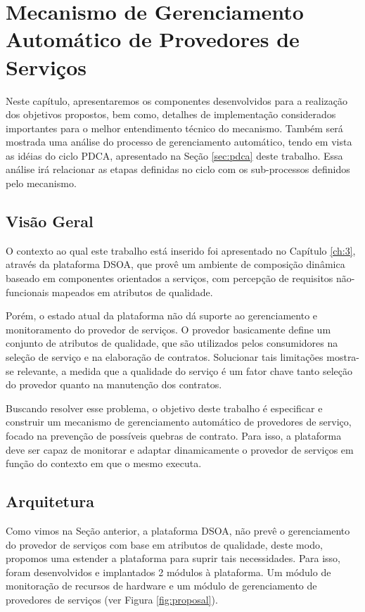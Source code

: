 \chapter{Mecanismo de Gerenciamento Automático de Provedores de Serviços}
\label{ch:4}

Neste capítulo, apresentaremos os componentes desenvolvidos para a realização dos objetivos propostos, bem como, detalhes de implementação considerados importantes para o melhor entendimento técnico do mecanismo. Também será mostrada uma análise do processo de gerenciamento automático, tendo em vista as idéias do ciclo PDCA, apresentado na Seção \ref{sec:pdca} deste trabalho. Essa análise irá relacionar as etapas definidas no ciclo com os sub-processos definidos pelo mecanismo.

\section{Visão Geral}
O contexto ao qual este trabalho está inserido foi apresentado no Capítulo \ref{ch:3}, através da plataforma DSOA, que provê um ambiente de composição dinâmica baseado em componentes orientados a serviços, com percepção de requisitos não-funcionais mapeados em atributos de qualidade. 

Porém, o estado atual da plataforma não dá suporte ao gerenciamento e monitoramento do provedor de serviços. O provedor basicamente define um conjunto de atributos de qualidade, que são utilizados pelos consumidores na seleção de serviço e na elaboração de contratos. Solucionar tais limitações mostra-se relevante, a medida que a qualidade do serviço é um fator chave tanto seleção do provedor quanto na manutenção dos contratos.

Buscando resolver esse problema, o objetivo deste trabalho é especificar e construir um mecanismo de gerenciamento automático de provedores de serviço, focado na prevenção de possíveis quebras de contrato. Para isso, a plataforma deve ser capaz de monitorar e adaptar dinamicamente o provedor de serviços em função do contexto em que o mesmo executa.


\section{Arquitetura}
\label{sec:arch_prop}

Como vimos na Seção anterior, a plataforma DSOA, não prevê o gerenciamento do provedor de serviços com base em atributos de qualidade, deste modo, propomos uma estender a plataforma para suprir tais necessidades. Para isso, foram desenvolvidos e implantados 2 módulos à plataforma. Um módulo de monitoração de recursos de hardware e um módulo de gerenciamento de provedores de serviços (ver Figura \ref{fig:proposal}).

